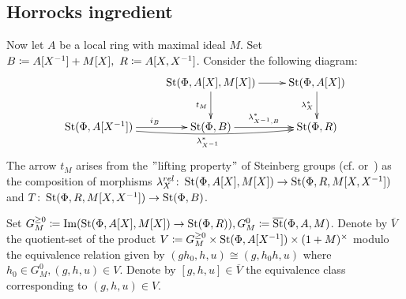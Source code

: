 \subsection{Horrocks ingredient}\label{subsec:horrocks-ingredient}


Now let $A$ be a local ring with maximal ideal $M$.
Set $B \coloneqq A[X^{-1}] + M[X],\ R \coloneqq A[X, X^{-1}]$.
Consider the following diagram:
\[ \xymatrix{ & \St(\Phi, A[X], M[X]) \ar[d]_{t_M} \ar[r] & \St(\Phi, A[X]) \ar[d]_{\lambda_X^*} \\
\St(\Phi, A[X\inv]) \ar[r]^{i_B} \ar@/_/[rr]_{\lambda_{X\inv}^*} & \St(\Phi, B) \ar[r]^{\lambda^*_{X\inv, B}} & \St(\Phi, R)
}\]
The arrow $t_M$ arises from the \("\)lifting property\("\) of Steinberg groups (cf. \cite[Lemma~3.3]{LS20} or~\cite[Theorem~3]{LS17}) as the composition of morphisms
$\lambda_{X}^{rel}\colon \operatorname{St}(\Phi, A[X], M[X]) \to \operatorname{St}(\Phi, R, M[X, X^{-1}])$ and $T \colon \operatorname{St}(\Phi, R, M[X, X^{-1}]) \to \operatorname{St}(\Phi, B)$.

Set $G_M^{\geq 0} \coloneqq \operatorname{Im}(\operatorname{St}(\Phi, A[X], M[X]) \to \operatorname{St}(\Phi, R)), G_M^0 \coloneqq \overline{\operatorname{St}}(\Phi, A, M)$.%
Denote by $\overline{V}$ the quotient-set of the product $V \coloneqq G_M^{\geq 0} \times \operatorname{St}(\Phi, A[X^{-1}]) \times (1 + M)^\times$
modulo the equivalence relation given by $(gh_0, h, u) \cong (g, h_0h, u)$ where $h_0 \in G_M^0, (g, h, u) \in V.$
Denote by $[g, h, u] \in \overline{V}$ the equivalence class corresponding to $(g, h, u)\in V$.
